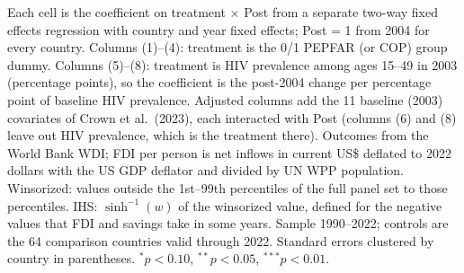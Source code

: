 \begin{table}[htbp]
\par\vspace{4pt}
\begin{minipage}{\textwidth}\footnotesize Each cell is the coefficient on treatment $\times$ Post from a separate two-way fixed effects regression with country and year fixed effects; Post = 1 from 2004 for every country. Columns (1)--(4): treatment is the 0/1 PEPFAR (or COP) group dummy. Columns (5)--(8): treatment is HIV prevalence among ages 15--49 in 2003 (percentage points), so the coefficient is the post-2004 change per percentage point of baseline HIV prevalence. Adjusted columns add the 11 baseline (2003) covariates of Crown et al.\ (2023), each interacted with Post (columns (6) and (8) leave out HIV prevalence, which is the treatment there). Outcomes from the World Bank WDI; FDI per person is net inflows in current US\$ deflated to 2022 dollars with the US GDP deflator and divided by UN WPP population. Winsorized: values outside the 1st--99th percentiles of the full panel set to those percentiles. IHS: $\sinh^{-1}(w)$ of the winsorized value, defined for the negative values that FDI and savings take in some years. Sample 1990--2022; controls are the 64 comparison countries valid through 2022. Standard errors clustered by country in parentheses. $^{*}p<0.10$, $^{**}p<0.05$, $^{***}p<0.01$.\end{minipage}
\end{table}
